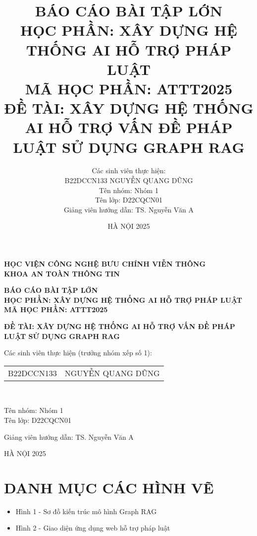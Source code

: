 \documentclass[a4paper,12pt]{article}
\title{BÁO CÁO BÀI TẬP LỚN \\ HỌC PHẦN: XÂY DỰNG HỆ THỐNG AI HỖ TRỢ PHÁP LUẬT \\ MÃ HỌC PHẦN: ATTT2025 \\ ĐỀ TÀI: XÂY DỰNG HỆ THỐNG AI HỖ TRỢ VẤN ĐỀ PHÁP LUẬT SỬ DỤNG GRAPH RAG}
\author{Các sinh viên thực hiện: \\  B22DCCN133 \quad NGUYỄN QUANG DŨNG \\ Tên nhóm: Nhóm 1 \\ Tên lớp: D22CQCN01 \\ Giảng viên hướng dẫn: TS. Nguyễn Văn A}
\date{HÀ NỘI 2025}
\begin{document}
\begin{center}
\textbf{HỌC VIỆN CÔNG NGHỆ BƯU CHÍNH VIỄN THÔNG} \\
\textbf{KHOA AN TOÀN THÔNG TIN} \\
\vspace{2cm}

\textbf{BÁO CÁO BÀI TẬP LỚN} \\
\textbf{HỌC PHẦN: XÂY DỰNG HỆ THỐNG AI HỖ TRỢ PHÁP LUẬT} \\
\textbf{MÃ HỌC PHẦN: ATTT2025} \\
\vspace{1cm}

\textbf{ĐỀ TÀI: XÂY DỰNG HỆ THỐNG AI HỖ TRỢ VẤN ĐỀ PHÁP LUẬT SỬ DỤNG GRAPH RAG} \\
\vspace{2cm}

Các sinh viên thực hiện (trưởng nhóm xếp số 1): \\
\begin{tabular}{ll}
B22DCCN133 & NGUYỄN QUANG DŨNG \\
\end{tabular} \\
\vspace{0.5cm}

Tên nhóm: Nhóm 1 \\
Tên lớp: D22CQCN01 \\
\vspace{0.5cm}

Giảng viên hướng dẫn: TS. Nguyễn Văn A \\
\vspace{2cm}

HÀ NỘI 2025
\end{center}

\clearpage



\clearpage

\tableofcontents

\clearpage

\section*{DANH MỤC CÁC HÌNH VẼ}
\begin{itemize}
    \item Hình 1 - Sơ đồ kiến trúc mô hình Graph RAG 
    \item Hình 2 - Giao diện ứng dụng web hỗ trợ pháp luật 
\end{itemize}
\clearpage
\end{document}
